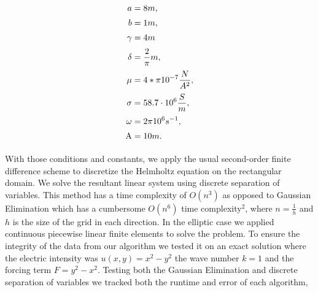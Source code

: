 \documentclass[11pt]{article}
\begin{document}
\begin{equation*}
    \begin{alignedat}{3}      
        & \hskip8em &a& =8m,&\hskip8em & \\[0.5ex]
        & \hskip8em &b& =1m,&\hskip8em & \\[0.5ex]
        & \hskip8em &\gamma& = 4m&\hskip8em & \\[0.5ex]
        & \hskip8em & \delta& =\frac{2}{\pi}m,&\hskip8em & \\[0.5ex]
        & \hskip8em & \mu& =4*\pi 10^{-7} \frac{N}{A^2},&\hskip8em & \\[0.5ex]
        & \hskip8em & \sigma& =58.7\cdot 10^{6} \frac{S}{m},&\hskip8em & \\[0.5ex]
        & \hskip8em & \omega& =2\pi 10^{6} s^{-1},&\hskip8em & \\[0.5ex]
        & \hskip8em & \text{A}& =10m.&\hskip8em & \\[0.5ex]
    \end{alignedat}
\end{equation*}


With those conditions and constants, we apply the usual second-order
finite difference scheme to discretize the Helmholtz equation on the
rectangular domain. We solve the resultant linear system using discrete
separation of variables. This method has a time complexity of $O(n^3)$
as opposed to Gaussian Elimination which has a cumbersome $O(n^6)$
time complexity$^2$, where $n=\frac{1}{h}$ and $h$ is the size
of the grid in each direction. In the elliptic case we applied
continuous piecewise linear finite elements to solve the problem. To
ensure the integrity of the data from our algorithm we tested it on an
exact solution where the electric intensity was $u(x,y)=x^2-y^2$ the
wave number $k=1$ and the forcing term $F=y^2-x^2$. Testing both the
Gaussian Elimination and discrete separation
of variables we tracked both the runtime and error of each algorithm,
\end{document}
